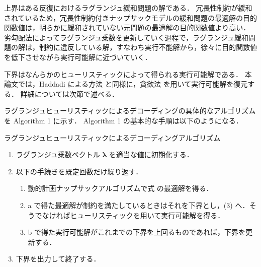 \documentclass[japanese]{jnlp_1.4}
\begin{document}
上界はある反復におけるラグランジュ緩和問題の解である．
冗長性制約が緩和されているため，冗長性制約付きナップサックモデルの緩和問題の最適解の目的関数値は，明らかに緩和されていない元問題の最適解の目的関数値より高い．
劣勾配法によってラグランジュ乗数を更新していく過程で，ラグランジュ緩和問題の解は，制約に違反している解，すなわち実行不能解から，徐々に目的関数値を低下させながら実行可能解に近づいていく．

下界はなんらかのヒューリスティックによって得られる実行可能解である．
本論文では，Haddadi による方法 \cite{haddadi97} と同様に，貪欲法 \cite{khuller99}を用いて実行可能解を復元する．
詳細については次節で述べる．

ラグランジュヒューリスティックによるデコーディングの具体的なアルゴリズムを Algorithm 1 に示す．
Algorithm 1 の基本的な手順は以下のようになる．

\begin{algorithm}[b]
\caption{ラグランジュヒューリスティックによるデコーディングアルゴリズム}
\begin{algorithmic}[1]
	\ENDIF
		\ENDIF
	\ELSE
	\ENDIF
\ENDFOR
{}
\end{algorithmic}
\end{algorithm}

\begin{enumerate}
\item ラグランジュ乗数ベクトル $\boldsymbol{\lambda}$ を適当な値に初期化する．
\item 以下の手続きを既定回数だけ繰り返す．
\begin{enumerate}
\item 動的計画ナップサックアルゴリズムで式 の最適解を得る．
\item a で得た最適解が制約を満たしているときはそれを下界とし，(3) へ．そうでなければヒューリスティックを用いて実行可能解を得る．
\item b で得た実行可能解がこれまでの下界を上回るものであれば，下界を更新する．
\end{enumerate}
\item 下界を出力して終了する．
\end{enumerate}
\end{document}
